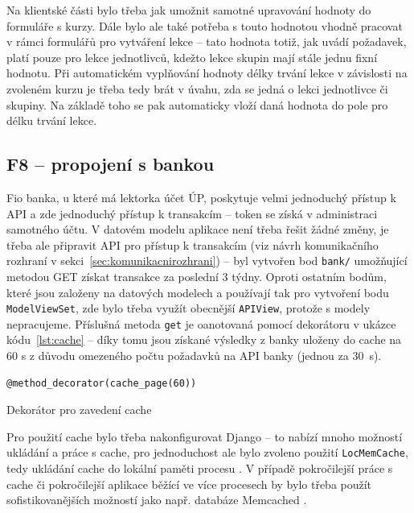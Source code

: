 Na klientské části bylo třeba jak umožnit samotné upravování hodnoty do formuláře s kurzy. Dále bylo ale také potřeba s touto hodnotou vhodně pracovat v rámci formulářů pro vytváření lekce -- tato hodnota totiž, jak uvádí požadavek, platí pouze pro lekce jednotlivců, kdežto lekce skupin mají stále jednu fixní hodnotu. Při automatickém vyplňování hodnoty délky trvání lekce v závislosti na zvoleném kurzu je třeba tedy brát v úvahu, zda se jedná o lekci jednotlivce či skupiny. Na základě toho se pak automaticky vloží daná hodnota do pole pro délku trvání lekce.

\subsection{F8 -- propojení s bankou}

Fio banka, u které má lektorka účet ÚP, poskytuje velmi jednoduchý přístup k API a zde jednoduchý přístup k transakcím -- token se získá v administraci samotného účtu. V datovém modelu aplikace není třeba řešit žádné změny, je třeba ale připravit API pro přístup k transakcím (viz návrh komunikačního rozhraní v sekci~\ref{sec:komunikacnirozhrani}) -- byl vytvořen bod \verb|bank/| umožňující metodou GET získat transakce za poslední 3 týdny. Oproti ostatním bodům, které jsou založeny na datových modelech a používají tak pro vytvoření bodu \verb|ModelViewSet|, zde bylo třeba využít obecnější \verb|APIView|, protože s modely nepracujeme. Příslušná metoda \verb|get| je oanotovaná pomocí dekorátoru v ukázce kódu~\ref{lst:cache} -- díky tomu jsou získané výsledky z banky uloženy do cache na 60 s z důvodu omezeného počtu požadavků na API banky (jednou za 30~s).

\begin{listing}[ht]
	\begin{verbatim}
@method_decorator(cache_page(60))
	\end{verbatim}
	\caption{Dekorátor pro zavedení cache}\label{lst:cache}
\end{listing}

Pro použití cache bylo třeba nakonfigurovat Django -- to nabízí mnoho možností ukládání a práce s cache, pro jednoduchost ale bylo zvoleno použití \verb|LocMemCache|, tedy ukládání cache do lokální paměti procesu \cite{django-docs-cache}. V případě pokročilejší práce s cache či pokročilejší aplikace běžící ve více procesech by bylo třeba použít sofistikovanějších možností jako např. databáze Memcached \cite{django-docs-cache}.


